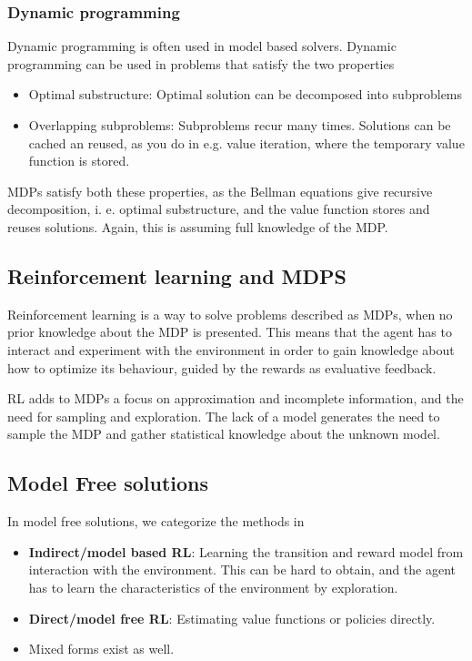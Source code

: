 \subsubsection{Dynamic programming}

Dynamic programming is often used in model based solvers. Dynamic programming can be used in problems that satisfy the two properties

\begin{itemize}
    \item Optimal substructure: Optimal solution can be decomposed into subproblems
    \item Overlapping subproblems: Subproblems recur many times. Solutions can be cached an reused, as you do in e.g. value iteration, where the temporary value function is stored. 
\end{itemize}

MDPs satisfy both these properties, as the Bellman equations give recursive decomposition, i. e. optimal substructure, and the value function stores and reuses solutions. Again, this is assuming full knowledge of the MDP.

\subsection{Reinforcement learning and MDPS}
Reinforcement learning is a way to solve problems described as MDPs, when
no prior knowledge about the MDP is presented. This means that the agent has to interact and experiment with the environment in order to gain knowledge about how to optimize its behaviour, guided by the rewards as evaluative feedback.

RL adds to MDPs a focus on approximation and incomplete information, and the need for sampling and exploration. The lack of a model generates the need to sample the MDP and gather statistical knowledge about the unknown model.

\subsection{Model Free solutions}

In model free solutions, we categorize the methods in

\begin{itemize}
    \item \textbf{Indirect/model based RL}: Learning the transition and reward model from interaction with the environment. This can be hard to obtain, and the agent has to learn the characteristics of the environment by exploration.
    \item \textbf{Direct/model free RL}: Estimating value functions or policies directly. 
    \item Mixed forms exist as well.
\end{itemize}

